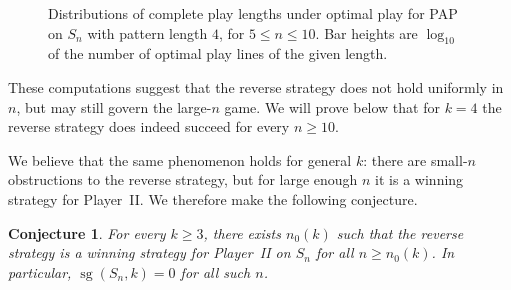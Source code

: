 \documentclass[11pt]{amsart}
\newcommand{\Sym}{S}
\newcommand{\sg}{\operatorname{sg}}
\theoremstyle{plain}
\newtheorem{conjecture}[theorem]{Conjecture}
\theoremstyle{definition}
\theoremstyle{remark}
\begin{document}
\begin{figure}[ht]
  \caption{Distributions of complete play lengths under optimal play for PAP on $\Sym_n$ with
    pattern length $4$, for $5 \leq n \leq 10$.  Bar heights are $\log_{10}$ of the number of optimal
    play lines of the given length.}
  \label{fig:k4-optimal-lengths}
\end{figure}

These computations suggest that the reverse strategy does not hold uniformly in~$n$, but may still
govern the large-$n$ game.  We will prove below that for $k=4$ the reverse strategy does indeed
succeed for every $n \geq 10$.

We believe that the same phenomenon holds for general $k$: there are small-$n$ obstructions to the reverse strategy,
but for large enough $n$ it is a winning strategy for Player~II.  We therefore make the following conjecture.

\begin{conjecture}\label{conj:general-reverse}
  For every $k \geq 3$, there exists $n_0(k)$ such that the reverse strategy is a winning strategy
  for Player~II on $\Sym_n$ for all $n \geq n_0(k)$.  In particular, $\sg(\Sym_n,k)=0$ for all such
  $n$.
\end{conjecture}
\end{document}
